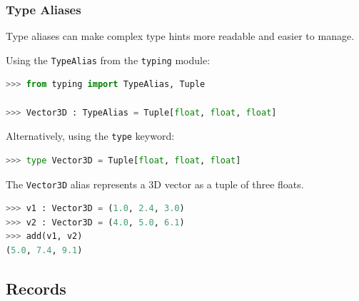 \documentclass[envcountsect,10pt]{beamer}
\begin{document}
\begin{frame}[fragile]
    \frametitle{Type Aliases}

    Type aliases can make complex type hints more readable and easier to manage.

    Using the \texttt{TypeAlias} from the \texttt{typing} module:

    \begin{lstlisting}[language=Python]
>>> from typing import TypeAlias, Tuple

>>> Vector3D : TypeAlias = Tuple[float, float, float]
    \end{lstlisting}

    Alternatively, using the \texttt{type} keyword:

    \begin{lstlisting}[language=Python]
>>> type Vector3D = Tuple[float, float, float]
    \end{lstlisting}

    The \texttt{Vector3D} alias represents a 3D vector as a tuple of three floats.

    \begin{lstlisting}[language=Python]
>>> v1 : Vector3D = (1.0, 2.4, 3.0)
>>> v2 : Vector3D = (4.0, 5.0, 6.1)
>>> add(v1, v2)
(5.0, 7.4, 9.1)
    \end{lstlisting}

\end{frame}

\subsection{Records}
\end{document}
